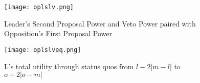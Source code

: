 \documentclass[12pt]{article}
\theoremstyle{plain}		      \newtheorem{assn}{Assumption}
\theoremstyle{plain}		      \newtheorem{prop}{Proposition}
\theoremstyle{plain}		      \newtheorem{lemma}{Lemma}
\theoremstyle{plain}	          \newtheorem{imp}{Implication}
\theoremstyle{plain}	          \newtheorem{hyp}{Hypothesis}
\theoremstyle{definition}		  \newtheorem{defn}{Definition}
\theoremstyle{remark}	          \newtheorem{rem}{Remark}
\theoremstyle{definition}         \newtheorem{case}{Case}
\begin{document}
\begin{figure}[h]
  \centering
  \begin{minipage}[b]{0.3\textwidth}
    \texttt{[image: oplslv.png]}
    \caption{Leader's Second Proposal Power and Veto Power paired with Opposition's First Proposal Power}
    \label{oplslv}
  \end{minipage}
  \hfill
  \begin{minipage}[b]{0.6\textwidth}
    \texttt{[image: oplslveq.png]}
    \caption{L's total utility through status quos from \newline $l-2|m-l|$ to $o+2|o-m|$}
    \label{oplslveq}
  \end{minipage}
\end{figure}
\FloatBarrier
\end{document}
